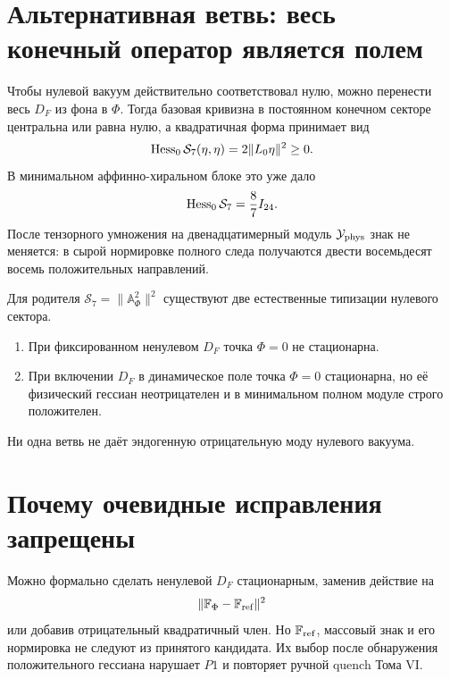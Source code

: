 \section{Альтернативная ветвь: весь конечный оператор является полем}

Чтобы нулевой вакуум действительно соответствовал нулю, можно перенести
весь $D_F$ из фона в $\Phi$. Тогда базовая кривизна в постоянном конечном
секторе центральна или равна нулю, а квадратичная форма принимает вид
\begin{equation}
 \operatorname{Hess}_0\mathcal S_7(\eta,\eta)
 =2\|L_0\eta\|^2\ge0.
 \label{eq:v7-zero-df-positive-hessian}
\end{equation}
В минимальном аффинно-хиральном блоке это уже дало
\begin{equation}
 \operatorname{Hess}_0\mathcal S_7=\frac87I_{24}.
\end{equation}
После тензорного умножения на двенадцатимерный модуль
$\mathcal Y_{\rm phys}$ знак не меняется: в сырой нормировке полного следа
получаются двести восемьдесят восемь положительных направлений.

\begin{theorem}
Для родителя
$\mathcal S_7=\|\mathbb A_\Phi^2\|^2$ существуют две естественные
типизации нулевого сектора.
\begin{enumerate}
 \item При фиксированном ненулевом $D_F$ точка $\Phi=0$ не стационарна.
 \item При включении $D_F$ в динамическое поле точка $\Phi=0$ стационарна,
 но её физический гессиан неотрицателен и в минимальном полном модуле строго
 положителен.
\end{enumerate}
Ни одна ветвь не даёт эндогенную отрицательную моду нулевого вакуума.
\end{theorem}

\section{Почему очевидные исправления запрещены}

Можно формально сделать ненулевой $D_F$ стационарным, заменив действие на
\begin{equation}
 \|\mathbb F_\Phi-\mathbb F_{\rm ref}\|^2
\end{equation}
или добавив отрицательный квадратичный член. Но $\mathbb F_{\rm ref}$,
массовый знак и его нормировка не следуют из принятого кандидата. Их выбор
после обнаружения положительного гессиана нарушает $P1$ и повторяет ручной
quench Тома VI.

